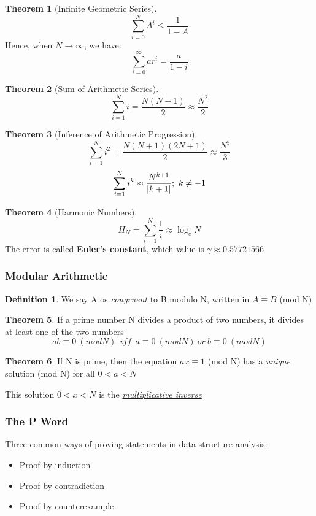 \documentclass[12pt]{article}
\theoremstyle{definition}
\newtheorem{definition}{Definition}[section]
\newtheorem{theorem}{Theorem}[section]
\DeclarePairedDelimiter \abs{\lvert}{\rvert} %
\begin{document}
\begin{theorem}[Infinite Geometric Series]
    $$\sum_{i=0}^N A^i \leq \frac{1}{1-A}$$ 
Hence, when $N \rightarrow \infty$, we have:
    $$\sum_{i=0}^{\infty} ar^i = \frac{a}{1-i}$$
\end{theorem}

\begin{theorem}[Sum of Arithmetic Series]
    $$\sum_{i=1}^N i = \frac{N(N+1)}{2} \approx \frac{N^2}{2}$$
\end{theorem}

\begin{theorem}[Inference of Arithmetic Progression]
    $$\sum_{i=1}^N i^2 = \frac{N(N+1)(2N+1)}{2} \approx \frac{N^3}{3}$$
    $$\sum_{i=1}^N i^k \approx \frac{N^{k+1}}{\abs{k+1}};\ k \neq -1$$
\end{theorem}

\begin{theorem}[Harmonic Numbers]
    $$H_N = \sum_{i=1}^N \frac{1}{i} \approx \log_{e}N$$
The error is called \textbf{Euler's constant}, which value is $\gamma \approx 0.57721566$
\end{theorem}

\subsubsection{Modular Arithmetic}
\begin{definition}
    We say A os \textit{congruent} to B modulo N, written in $A \equiv B$ (mod N)
\end{definition}

\begin{theorem}
If a prime number N divides a product of two numbers, it divides at least one of the two numbers 
    $$ab \equiv 0\ (mod N)\ \ iff\ \ a \equiv 0\ (mod N)\ or\ b \equiv 0\ (mod N)$$
\end{theorem}

\begin{theorem}
    If N is prime, then the equation $ax \equiv 1$ (mod N) has a \textit{unique} solution (mod N) for
    all $0 < a < N$

    This solution $0 < x < N$ is the \underline{\emph{multiplicative inverse}}
\end{theorem}

\subsubsection{The P Word}
Three common ways of proving statements in data structure analysis:
\begin{itemize}
    \item Proof by induction
    \item Proof by contradiction
    \item Proof by counterexample
\end{itemize}
\end{document}
